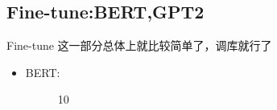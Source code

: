 \documentclass[UTF8]{ctexbeamer}
\begin{document}
\subsection{Fine-tune:BERT,GPT2}
\begin{frame}[allowframebreaks]{Fine-tune}
	这一部分总体上就比较简单了，调库就行了
	\begin{itemize}
		\item BERT:
		\begin{figure}[H]
			\centering  %
			\caption{10}	
		\end{figure}

\end{itemize}
\end{frame}
\end{document}
